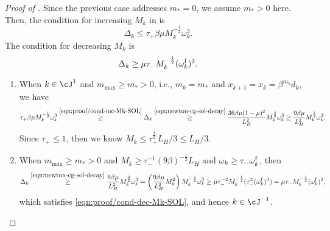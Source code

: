 \begin{proof}[Proof of ]
    Since the previous case addresses $m_* = 0$, we assume $m_* > 0$ here.
    Then, the condition for increasing $M_k$ in  is
    \begin{equation}
        \label{eqn:proof/cond-inc-Mk-SOL}
        \Delta_k \leq \tau_+ \beta \mu M_k^{-\frac{1}{2}} \omega_k^3.
    \end{equation}
    The condition for decreasing $M_k$ is
    \begin{equation}
        \label{eqn:proof/cond-dec-Mk-SOL}
        \Delta_k \geq \mu \tau_- M_k^{-\frac{1}{2}} (\omega_k^{\mathrm{f}})^3.
    \end{equation}

    \begin{enumerate}
        \item When $k \in \cJ^1$ and $m_{\mathrm{max}} \geq m_* > 0$,
        i.e., $m_k = m_*$ and $x_{k+1} = x_k = \beta^{m_k} d_k$,
         we have
    \begin{align*}
         \tau_+ \beta \mu M_k^{-\frac{1}{2}} \omega_k^3
         \overset{\eqref{eqn:proof/cond-inc-Mk-SOL}}{\geq}
        \Delta_k
         \overset{\eqref{eqn:newton-cg-sol-decay}}{\geq}
         \frac{36\beta\mu(1 - \mu)^2}{L_H^2} M_k^{\frac{3}{2}} \omega_k^3
         \geq \frac{9\beta\mu}{L_H^2} M_k^{\frac{3}{2}} \omega_k^3,
    \end{align*}
    Since $\tau_+ \leq 1$, then we know $M_k \leq \tau_+^{\frac{1}{2}} L_H / 3 \leq L_H / 3$.
        \item When $m_{\mathrm{max}} \geq m_*  > 0$ and $M_{k} \geq \tau_-^{-1}(9\beta)^{-\frac{1}{2}}L_H$ 
        and $\omega_k \geq \tau_- \omega_k^{\mathrm{f}}$,
    then 
    \begin{align*}
        \Delta_k
         \overset{\eqref{eqn:newton-cg-sol-decay}}{\geq}
        \frac{9\beta\mu}{L_H^2} M_k^{\frac{3}{2}}  \omega_k^3
        = \left (\frac{9\beta\mu}{L_H^2} M_k^{2} \right ) M_k^{-\frac{1}{2}} \omega_k^3
        \geq 
        \mu \tau_-^{-2} M_k^{-\frac{1}{2}} (\tau_-^{3}(\omega_k^{\mathrm{f}})^3)
        =
        \mu \tau_- M_k^{-\frac{1}{2}} (\omega_k^{\mathrm{f}})^3,
    \end{align*}
        which satisfies \eqref{eqn:proof/cond-dec-Mk-SOL}, and hence $k \in \cJ^{-1}$.


\end{enumerate}
\end{proof}
